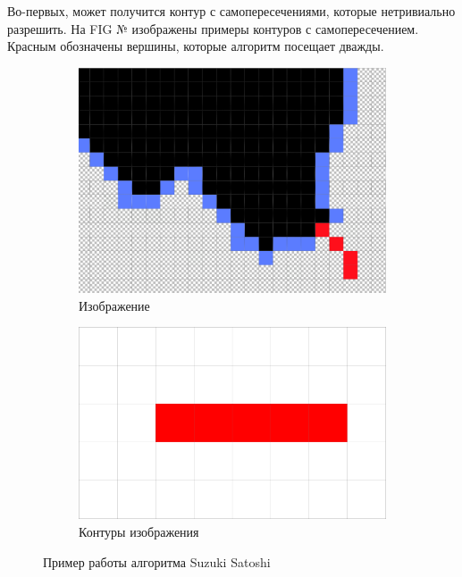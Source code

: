 \documentclass{fefu_thesis/cls/fefu}
\begin{document}
    Во-первых, может получится контур с самопересечениями, которые нетривиально разрешить. На FIG № изображены примеры контуров с самопересечением. Красным обозначены вершины, которые алгоритм посещает дважды.
    \begin{figure}[H]
        \centering
        \begin{subfigure}[t]{.49\linewidth}
            \centering
            \includegraphics[scale=0.2]{images/SelfIntersectingContour1.png}
            \caption{Изображение}
        \end{subfigure}
        \begin{subfigure}[t]{.49\linewidth}
            \centering
            \includegraphics[scale=0.4]{images/SelfIntersectingContour2.png}
            \caption{Контуры изображения}
        \end{subfigure}
        \caption{Пример работы алгоритма Suzuki Satoshi}
    \end{figure}
\end{document}
